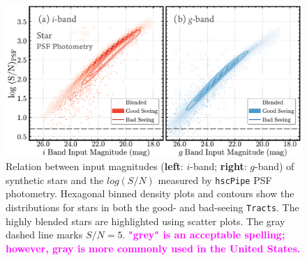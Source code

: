 \documentclass[useamsfonts]{pasj01}
\def\hscpipe{\texttt{hscPipe}}
\def\tracts{\texttt{Tracts}}
\newcommand{\susan}[1]{\textcolor{magenta} {\textbf{#1}}}
\begin{document}
\begin{figure}
    \begin{center}
        \includegraphics[width=\textwidth]{fig/synpipe_psf_sn}
    \end{center}
    \caption{
        Relation between input magnitudes (\textbf{left}: $i$-band; \textbf{right}:
        $g$-band) of synthetic stars and the $log(S/N)$ measured by \hscpipe{} PSF
        photometry.
        Hexagonal binned density plots and contours show the distributions for
        stars in both the good- and bad-seeing \tracts{}.
        The highly blended stars are highlighted using scatter plots. 
        The gray dashed line marks $S/N = 5$. \susan{"grey" is an acceptable spelling; however, gray is more commonly used in the United States.}
        }
    \label{fig:star_sn}
\end{figure}
\end{document}
